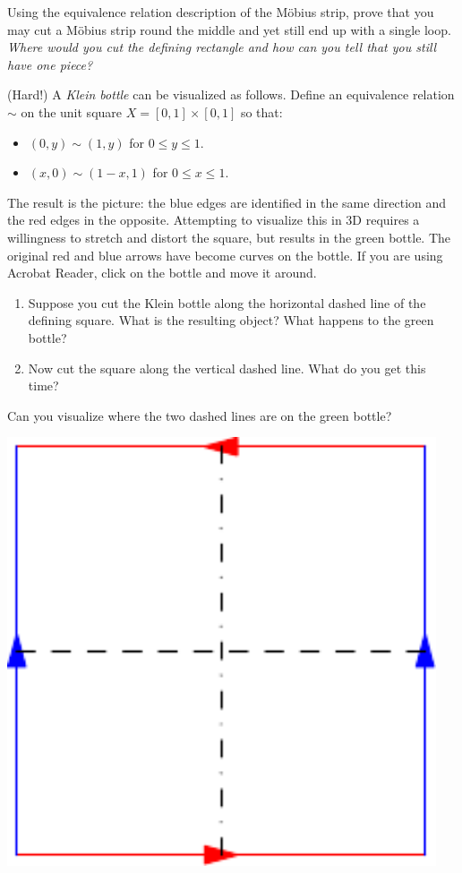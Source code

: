 \begin{enumerate}
	\item Using the equivalence relation description of the Möbius strip, prove that you may cut a Möbius strip round the middle and yet still end up with a single loop.\\
	\emph{Where would you cut the defining rectangle and how can you tell that you still have one piece?}

	\noindent\begin{minipage}{0.7\textwidth}
	\item (Hard!) A \emph{Klein bottle} can be visualized as follows. Define an equivalence relation $\sim$ on the unit square $X=[0,1]\times[0,1]$ so that:
	\begin{itemize}
	  \item $(0,y)\sim (1,y)$ for $0\le y\le 1$.
	  \item $(x,0)\sim(1-x,1)$ for $0\le x\le 1$.
	\end{itemize}
	The result is the picture: the blue edges are identified in the same direction and the red edges in the opposite. Attempting to visualize this in 3D requires a willingness to stretch and distort the square, but results in the green bottle. The original red and blue arrows have become curves on the bottle. If you are using Acrobat Reader, click on the bottle and move it around.
	\begin{enumerate}
	  \item Suppose you cut the Klein bottle along the horizontal dashed line of the defining square. What is the resulting object? What happens to the green bottle?
	  \item Now cut the square along the vertical dashed line. What do you get this time?
	\end{enumerate}
	Can you visualize where the two dashed lines are on the green bottle?
	\end{minipage}\qquad
	\begin{minipage}{0.2\textwidth}
	\includegraphics[width=0.95\textwidth]{relations-hw01-kleinsquare}\\[5pt]

\end{minipage}
\end{enumerate}
